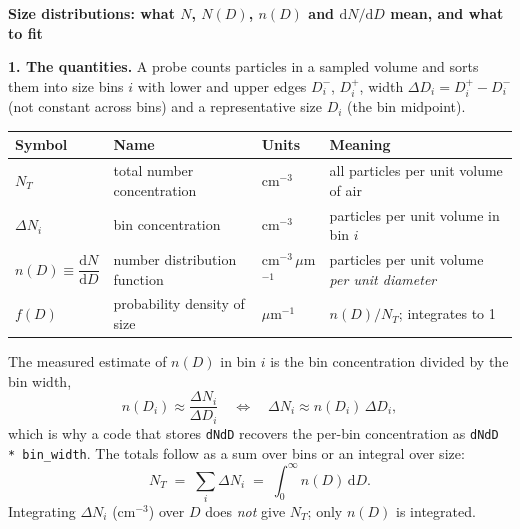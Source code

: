 \documentclass[10pt]{article}
\begin{document}
\begin{center}
{\large\bfseries Size distributions: what $N$, $N(D)$, $n(D)$ and $\mathrm{d}N/\mathrm{d}D$ mean, and what to fit}
\end{center}

\textbf{1. The quantities.} A probe counts particles in a sampled volume and sorts them into size bins
$i$ with lower and upper edges $D_i^{-}$, $D_i^{+}$, width $\Delta D_i = D_i^{+}-D_i^{-}$ (not constant
across bins) and a representative size $D_i$ (the bin midpoint).

\begin{center}
\begin{tabular}{@{}llll@{}}
\toprule
Symbol & Name & Units & Meaning \\
\midrule
$N_T$ & total number concentration & cm$^{-3}$ & all particles per unit volume of air \\
$\Delta N_i$ & bin concentration & cm$^{-3}$ & particles per unit volume in bin $i$ \\
$n(D) \equiv \dfrac{\mathrm{d}N}{\mathrm{d}D}$ & number distribution function & cm$^{-3}\,\mu$m$^{-1}$ &
particles per unit volume \emph{per unit diameter} \\
$f(D)$ & probability density of size & $\mu$m$^{-1}$ & $n(D)/N_T$; integrates to 1 \\
\bottomrule
\end{tabular}
\end{center}

The measured estimate of $n(D)$ in bin $i$ is the bin concentration divided by the bin width,
\begin{equation}
n(D_i) \approx \frac{\Delta N_i}{\Delta D_i}
\quad\Longleftrightarrow\quad
\Delta N_i \approx n(D_i)\,\Delta D_i ,
\end{equation}
which is why a code that stores \texttt{dNdD} recovers the per-bin concentration as
\texttt{dNdD * bin\_width}. The totals follow as a sum over bins or an integral over size:
\begin{equation}
N_T \;=\; \sum_i \Delta N_i \;=\; \int_0^\infty n(D)\,\mathrm{d}D .
\end{equation}
Integrating $\Delta N_i$ (cm$^{-3}$) over $D$ does \emph{not} give $N_T$; only $n(D)$ is integrated.
\end{document}
